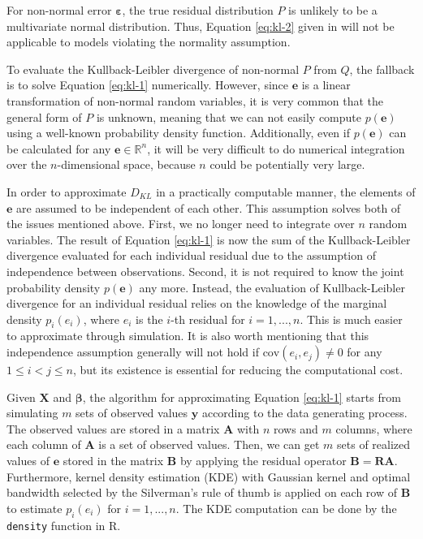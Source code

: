 \documentclass[]{interact}
\theoremstyle{plain}%
\theoremstyle{definition}
\theoremstyle{remark}
\begin{document}
For non-normal error \(\boldsymbol{\varepsilon}\), the true residual
distribution \(P\) is unlikely to be a multivariate normal distribution.
Thus, Equation \ref{eq:kl-2} given in \citet{li2024plot} will not be
applicable to models violating the normality assumption.

To evaluate the Kullback-Leibler divergence of non-normal \(P\) from
\(Q\), the fallback is to solve Equation \ref{eq:kl-1} numerically.
However, since \(\boldsymbol{e}\) is a linear transformation of
non-normal random variables, it is very common that the general form of
\(P\) is unknown, meaning that we can not easily compute
\(p(\boldsymbol{e})\) using a well-known probability density function.
Additionally, even if \(p(\boldsymbol{e})\) can be calculated for any
\(\boldsymbol{e} \in \mathbb{R}^n\), it will be very difficult to do
numerical integration over the \(n\)-dimensional space, because \(n\)
could be potentially very large.

In order to approximate \(D_{KL}\) in a practically computable manner,
the elements of \(\boldsymbol{e}\) are assumed to be independent of each
other. This assumption solves both of the issues mentioned above. First,
we no longer need to integrate over \(n\) random variables. The result
of Equation \ref{eq:kl-1} is now the sum of the Kullback-Leibler
divergence evaluated for each individual residual due to the assumption
of independence between observations. Second, it is not required to know
the joint probability density \(p(\boldsymbol{e})\) any more. Instead,
the evaluation of Kullback-Leibler divergence for an individual residual
relies on the knowledge of the marginal density \(p_i(e_i)\), where
\(e_i\) is the \(i\)-th residual for \(i = 1, ..., n\). This is much
easier to approximate through simulation. It is also worth mentioning
that this independence assumption generally will not hold if
\(\text{cov}(e_i, e_j) \neq 0\) for any \(1 \leq i < j \leq n\), but its
existence is essential for reducing the computational cost.

Given \(\boldsymbol{X}\) and \(\boldsymbol{\beta}\), the algorithm for
approximating Equation \ref{eq:kl-1} starts from simulating \(m\) sets
of observed values \(\boldsymbol{y}\) according to the data generating
process. The observed values are stored in a matrix \(\boldsymbol{A}\)
with \(n\) rows and \(m\) columns, where each column of
\(\boldsymbol{A}\) is a set of observed values. Then, we can get \(m\)
sets of realized values of \(\boldsymbol{e}\) stored in the matrix
\(\boldsymbol{B}\) by applying the residual operator
\(\boldsymbol{B} = \boldsymbol{R}\boldsymbol{A}\). Furthermore, kernel
density estimation (KDE) with Gaussian kernel and optimal bandwidth
selected by the Silverman's rule of thumb \citep{silverman2018density}
is applied on each row of \(\boldsymbol{B}\) to estimate \(p_i(e_i)\)
for \(i = 1, ..., n\). The KDE computation can be done by the
\texttt{density} function in R.
\end{document}
